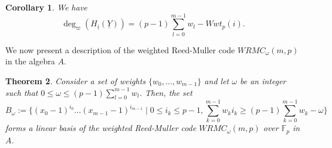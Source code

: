 \documentclass{article}
\theoremstyle{plain}
\newtheorem{thm}{Theorem}[section]
\newtheorem{cor}[thm]{Corollary}
\theoremstyle{definition}
\begin{document}
\begin{cor}\label{weightdeg}
We have
\begin{equation*}
\deg_{\varpi}(H_{\underline{i}}(\underline{Y}))=(p-1)\sum_{l=0}^{m-1}w_{l}-Wwt_{p}(i).
\end{equation*}
\end{cor}
\noindent We now present a description of the weighted Reed-Muller code $WRMC_{\omega}(m,p)$ in the algebra $A$.
\begin{thm}
Consider  a set of weights $\{w_{0},\ldots ,w_{m-1}\}$ and let $\omega$ be an integer such that $0\leq \omega\leq (p-1)\sum_{l=0}^{m-1}w_{l}$. Then, the set
\begin{equation*}
B_{\omega}:=\{(x_{0}-1)^{i_{0}}\ldots (x_{m-1}-1)^{i_{m-1}}\mid 0\leq i_{k}\leq p-1, \sum_{k=0}^{m-1}w_{k}i_{k}\geq (p-1)\sum_{k=0}^{m-1}w_{k}-\omega\}
\end{equation*}
forms a linear basis of the weighted Reed-Muller code $WRMC_{\omega}(m,p)$ over $\mathbb{F}_{p}$ in $A$.
\end{thm}
\end{document}
